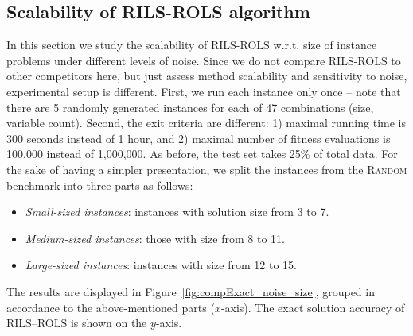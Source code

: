 \documentclass{bmcart}
\begin{document}
\subsection{Scalability of \textsc{RILS}-\textsc{ROLS} algorithm}\label{sec:scalability-rils-rols}

In this section we study the scalability of \textsc{RILS-ROLS} w.r.t. size of instance problems under different levels of noise.
Since we do not compare \textsc{RILS-ROLS} to other competitors here, but just assess method scalability and sensitivity to noise, experimental setup is different. First, we run each instance only once -- note that there are 5 randomly generated instances for each of 47 combinations (size, variable count). Second, the exit criteria are different: 1) maximal running time is 300 seconds instead of 1 hour, and 2) maximal number of fitness evaluations is 100,000 instead of 1,000,000. 
As before, the test set takes 25\% of total data. 
For the sake of having a simpler presentation, we split the instances from the \textsc{Random} benchmark into three parts as follows: 
\begin{itemize}
	\item \textit{Small-sized instances}: instances with solution size from 3 to 7.
	\item \textit{Medium-sized instances}: those with size from 8 to 11.
	\item \textit{Large-sized instances}: instances with size from 12 to 15. 
\end{itemize}

The results are displayed in Figure~\ref{fig:compExact_noise_size}, grouped in accordance to the above-mentioned parts ($x$-axis). The exact solution accuracy of \textsc{RILS}--\textsc{ROLS} is shown on the $y$-axis.   

\begin{center}
	\label{fig:compExact_noise_size}
\end{center}
\end{document}
